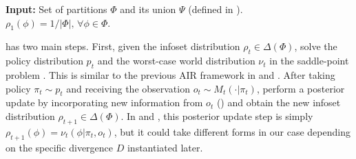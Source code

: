 \begin{algorithm}[H]
    \caption{General Framework}
     \label{alg:general}
    \textbf{Input:} Set of partitions $\Phi$ and its union $\Psi$ (defined in ). \\
    $\rho_1(\phi) = 1/|\Phi|,\, \forall \phi \in \Phi$. \\
        \vspace{-3pt}
\end{algorithm}
 has two main steps. First, given the infoset distribution $\rho_t\in\Delta(\Phi)$, solve the policy distribution $p_t$ and the worst-case world distribution $\nu_t$ in the saddle-point problem . This is similar to the previous AIR framework in \cite{xu2023bayesian} and \cite{liu2025decision}. After taking policy $\pi_t\sim p_t$ and receiving the observation $o_t\sim M_t(\cdot|\pi_t)$, perform a posterior update by incorporating new information from $o_t$ () and obtain the new infoset distribution $\rho_{t+1}\in\Delta(\Phi)$. In \cite{xu2023bayesian} and \cite{liu2025decision}, this posterior update step is simply $\rho_{t+1}(\phi) = \nu_t(\phi|\pi_t, o_t)$, but it could take different forms in our case depending on the specific divergence $D$ instantiated later. 

